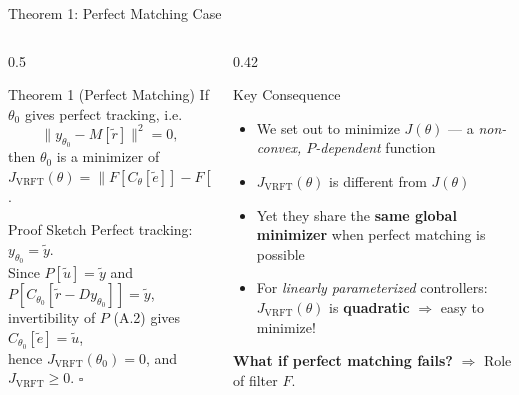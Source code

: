 \documentclass[hyperref={pdfpagemode=FullScreen},aspectratio=169]{beamer}
\newcommand{\highlight}[1]{{\color{accentgreen!70!black}\textbf{#1}}}
\newcommand{\JJ}{J_{\mathrm{VRFT}}}
\newcommand{\Jopt}{J}
\begin{document}
\begin{frame}{Theorem 1: Perfect Matching Case}
  \begin{columns}[T]
    \begin{column}{0.5\textwidth}
      \begin{block}{Theorem 1 (Perfect Matching)}
        If $\theta_0$ gives perfect tracking, i.e.\
        \[
          \|y_{\theta_0} - M[\tilde{r}]\|^2 = 0,
        \]
        then $\theta_0$ is a minimizer of $\JJ(\theta) = \|F[C_\theta[\tilde{e}]] - F[\tilde{u}]\|^2$.
      \end{block}
      \vspace{0.4em}
      \begin{block}{Proof Sketch}
        Perfect tracking: $y_{\theta_0} = \tilde{y}$.\\
        Since $P[\tilde{u}] = \tilde{y}$ and $P[C_{\theta_0}[\tilde{r}-Dy_{\theta_0}]] = \tilde{y}$,\\
        invertibility of $P$ (A.2) gives $C_{\theta_0}[\tilde{e}] = \tilde{u}$,\\
        hence $\JJ(\theta_0) = 0$, and $\JJ \geq 0$. \qquad $\square$
      \end{block}
    \end{column}
    \begin{column}{0.42\textwidth}
      \begin{exampleblock}{Key Consequence}
        \begin{itemize}
          \item We set out to minimize $\Jopt(\theta)$ --- a \emph{non-convex, $P$-dependent} function
          \item $\JJ(\theta)$ is different from $\Jopt(\theta)$
          \item Yet they share the \highlight{same global minimizer} when perfect matching is possible
          \item For \emph{linearly parameterized} controllers: $\JJ(\theta)$ is \highlight{quadratic} $\Rightarrow$ easy to minimize!
        \end{itemize}
      \end{exampleblock}
      \vspace{0.3em}
      \textbf{What if perfect matching fails?} $\Rightarrow$ Role of filter $F$.
    \end{column}
  \end{columns}
\end{frame}
\end{document}
